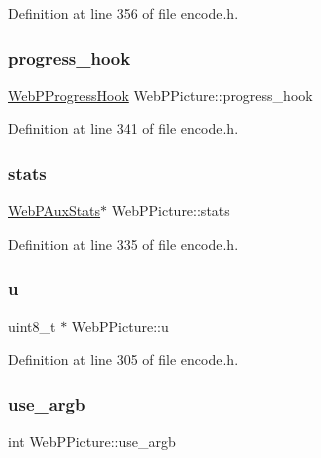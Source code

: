 Definition at line 356 of file encode.\+h.

\mbox{\label{struct_web_p_picture_a527ac4ef1fc0963b52d9573dddecc1de}} 
\subsubsection{\texorpdfstring{progress\_hook}{progress\_hook}}
{\footnotesize\ttfamily \mbox{\hyperlink{encode_8h_abb01f38a3187a4a225dc4456ec14acaa}{Web\+P\+Progress\+Hook}} Web\+P\+Picture\+::progress\+\_\+hook}



Definition at line 341 of file encode.\+h.

\mbox{\label{struct_web_p_picture_a7da1a6c4953bdf7ed2c1aba6d8af5956}} 
\subsubsection{\texorpdfstring{stats}{stats}}
{\footnotesize\ttfamily \mbox{\hyperlink{struct_web_p_aux_stats}{Web\+P\+Aux\+Stats}}$\ast$ Web\+P\+Picture\+::stats}



Definition at line 335 of file encode.\+h.

\mbox{\label{struct_web_p_picture_a073da8cb988f1a32d1859d708561d181}} 
\subsubsection{\texorpdfstring{u}{u}}
{\footnotesize\ttfamily uint8\+\_\+t $\ast$ Web\+P\+Picture\+::u}



Definition at line 305 of file encode.\+h.

\mbox{\label{struct_web_p_picture_a80d9adec5005d52025ac7e4407bd464e}} 
\subsubsection{\texorpdfstring{use\_argb}{use\_argb}}
{\footnotesize\ttfamily int Web\+P\+Picture\+::use\+\_\+argb}



